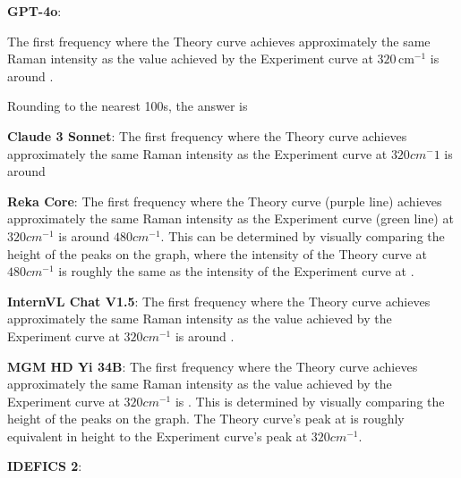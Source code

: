 \begin{wronganswer}
\textbf{GPT-4o}: \small{The first frequency where the Theory curve achieves approximately the same Raman intensity as the value achieved by the Experiment curve at \( 320 \, \text{cm}^{-1} \) is around .

Rounding to the nearest 100s, the answer is }
\end{wronganswer}

\begin{wronganswer}
\textbf{Claude 3 Sonnet}: \small{The first frequency where the Theory curve achieves approximately the same Raman intensity as the Experiment curve at \(320 cm^-1\) is around }
\end{wronganswer}

\begin{wronganswer}
\textbf{Reka Core}: \small{ The first frequency where the Theory curve (purple line) achieves approximately the same Raman intensity as the Experiment curve (green line) at \( 320 cm^{-1}\) is around \( 480 cm^{-1}\). This can be determined by visually comparing the height of the peaks on the graph, where the intensity of the Theory curve at \( 480 cm^{-1}\) is roughly the same as the intensity of the Experiment curve at .}
\end{wronganswer}

\begin{wronganswer}
\textbf{InternVL Chat V1.5}: \small{The first frequency where the Theory curve achieves approximately the same Raman intensity as the value achieved by the Experiment curve at \( 320 cm^{-1}\) is around .}
\end{wronganswer}

\begin{wronganswer}
\textbf{MGM HD Yi 34B}: \small{The first frequency where the Theory curve achieves approximately the same Raman intensity as the value achieved by the Experiment curve at \( 320 cm^{-1}\) is . This is determined by visually comparing the height of the peaks on the graph. The Theory curve's peak at  is roughly equivalent in height to the Experiment curve's peak at \( 320 cm^{-1}\).}
\end{wronganswer}

\begin{wronganswer}
\textbf{IDEFICS 2}: \small{}
\end{wronganswer}
\newpage
